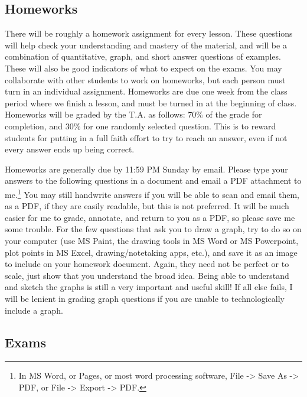 \documentclass{article}
\begin{document}
\hypertarget{homeworks}{%
\subsection*{Homeworks}\label{homeworks}}

There will be roughly a homework assignment for every lesson. These
questions will help check your understanding and mastery of the
material, and will be a combination of quantitative, graph, and short
answer questions of examples. These will also be good indicators of what
to expect on the exams. You may collaborate with other students to work
on homeworks, but each person must turn in an individual assignment.
Homeworks are due one week from the class period where we finish a
lesson, and must be turned in at the beginning of class. Homeworks will
be graded by the T.A. as follows: 70\% of the grade for completion, and
30\% for one randomly selected question. This is to reward students for
putting in a full faith effort to try to reach an answer, even if not
every answer ends up being correct.

Homeworks are generally due by 11:59 PM Sunday by email. Please type
your answers to the following questions in a document and email a PDF
attachment to me.\footnote{In MS Word, or Pages, or most word processing
  software, File -\textgreater{} Save As -\textgreater{} PDF, or File
  -\textgreater{} Export -\textgreater{} PDF.} You may still handwrite
answers if you will be able to scan and email them, as a PDF, if they
are easily readable, but this is not preferred. It will be much easier
for me to grade, annotate, and return to you as a PDF, so please save me
some trouble. For the few questions that ask you to draw a graph, try to
do so on your computer (use MS Paint, the drawing tools in MS Word or MS
Powerpoint, plot points in MS Excel, drawing/notetaking apps, etc.), and
save it as an image to include on your homework document. Again, they
need not be perfect or to scale, just show that you understand the broad
idea. Being able to understand and sketch the graphs is still a very
important and useful skill! If all else fails, I will be lenient in
grading graph questions if you are unable to technologically include a
graph.

\hypertarget{exams}{%
\subsection*{Exams}\label{exams}}
\end{document}
